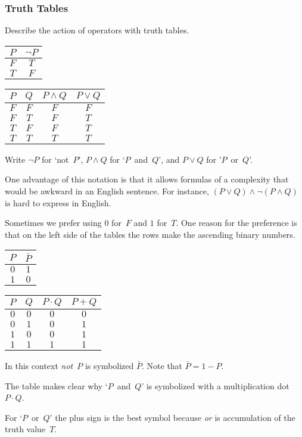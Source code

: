 \documentclass[10pt,t]{beamer}
\begin{document}
\begin{frame}
  \frametitle{Truth Tables}

Describe the action of operators with \alert{truth tables}. 
\begin{center}
  \begin{tabular}[t]{c|c}
    $P$  &$\neg P$  \\ \hline
    $F$  &$T$  \\
    $T$  &$F$
  \end{tabular}
  \qquad
  \begin{tabular}[t]{cc|cc}
    $P$  &$Q$  &$P\wedge Q$  &$P\vee Q$  \\ \hline
    $F$  &$F$  &$F$          &$F$  \\
    $F$  &$T$  &$F$          &$T$  \\
    $T$  &$F$  &$F$          &$T$  \\
    $T$  &$T$  &$T$          &$T$  
  \end{tabular}
\end{center}
Write $\neg P$ for `not~$P$', 
$P\wedge Q$ for `$P$~and~$Q$',
and $P\vee Q$ for '$P$~or~$Q$'.  

\pause
One advantage of this
notation is that it allows formulas of a complexity that would be awkward in
an English sentence. 
For instance,
$(P\vee Q)\wedge \neg(P\wedge Q)$ is hard to express in 
English.
\end{frame}




\begin{frame}
Sometimes we prefer using $0$ for~$F$ and $1$ for~$T$.
One reason for the preference is that on 
the left side of the tables the rows make the ascending binary numbers.
\begin{center}
  \begin{tabular}[t]{c|c}
    $P$  &$\bar{P}$  \\ \hline
    $0$  &$1$  \\
    $1$  &$0$
  \end{tabular}
  \qquad
  \begin{tabular}[t]{cc|cc}
    $P$  &$Q$  &$P\cdot Q$  &$P+ Q$  \\ \hline
    $0$  &$0$  &$0$          &$0$  \\
    $0$  &$1$  &$0$          &$1$  \\
    $1$  &$0$  &$0$          &$1$  \\
    $1$  &$1$  &$1$          &$1$  
  \end{tabular}
\end{center}
\pause
In this context \textit{not}~$P$ is symbolized $\bar{P}$.
Note that $\bar{P}=1-P$.

The table makes clear why `$P$~and~$Q$' is symbolized with a 
multiplication dot~$P\cdot Q$.

For `$P$~or~$Q$' the plus sign is the best symbol because 
\textit{or} is accumulation of the truth value~$T$.
\end{frame}
\end{document}
